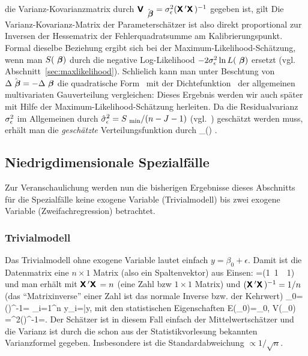 die Varianz-Kovarianzmatrix durch
$\textbf{\textsf{V}}\,_{\hat{{\mbox{ \boldmath{$\beta$}}}}}=\sigma_{\epsilon}^2(\textbf{\textsf{X}}\,'\textbf{\textsf{X}}\,)^{-1}$ gegeben ist, gilt
Die Varianz-Kovarianz-Matrix der Parametersch\"atzer ist also direkt
proportional zur Inversen der Hessematrix der Fehlerquadratsumme am Kalibrierungspunkt.
Formal dieselbe Beziehung ergibt sich bei der
Maximum-Likelihood-Sch\"atzung, wenn man $S({\mbox{ \boldmath{$\beta$}}})$
durch die negative Log-Likelihood $-2\sigma_{\epsilon}^2 \ln L({\mbox{ \boldmath{$\beta$}}})$ ersetzt
(vgl. Abschnitt~\ref{sec:maxlikelihood}).
Schlie\3lich kann man unter Beschtung von $\Delta \hat{{\mbox{ \boldmath{$\beta$}}}}=-\Delta
{\mbox{ \boldmath{$\beta$}}}$ die quadratische Form~ mit der
Dichtefunktion~ 
der allgemeinen
multivariaten Gau\3verteilung vergleichen:
Dieses Ergebnis werden wir auch sp\"ater mit Hilfe der
Maximum-Likelihood-Sch\"atzung herleiten.
Da die Residualvarianz $\sigma_{\epsilon}^2$ im Allgemeinen durch
$\hat{\sigma}_{\epsilon}^2=S_{{\mbox{ {\scriptsize \hspace{-0.0ex}min}}}}/(n-J-1)$ (vgl.~) gesch\"atzt
werden muss, erh\"alt man die \emph{gesch\"atzte} Verteilungsfunktion
durch
\be
\label{betaDensitySSEest}
_{\hatvecbeta}(\vecbeta) \propto \exp
{}.
\ee





\subsection{\label{sec:linStatSpez}Niedrigdimensionale Spezialf\"alle}

Zur Veranschaulichung werden nun die bisherigen Ergebnisse dieses
Abschnitts f\"ur die Spezialf\"alle keine exogene Variable
(Trivialmodell) bis zwei exogene Variable (Zweifachregression)
betrachtet.

\subsubsection{\label{sec:linStatTriv}Trivialmodell}

Das Trivialmodell ohne exogene Variable lautet einfach
$y=\beta_0+\epsilon$. Damit ist die Datenmatrix eine $n\times 1$ Matrix (also
ein Spaltenvektor) aus Einsen:
\bdm
{}\tr=(1\ 1\ \hdots \ 1)
\edm
und man erh\"alt mit $\textbf{\textsf{X}}\,'\textbf{\textsf{X}}\,=n$ (eine Zahl bzw $1\times 1$
Matrix) und $(\textbf{\textsf{X}}\,'\textbf{\textsf{X}}\,)^{-1}=1/n$ (das ``Matrixinverse'' einer
Zahl ist das normale Inverse bzw. der Kehrwert)
\be
\hatbeta_0=(\tr{})^{-1}\tr {}=
\sum_{i=1}^n y_i=\bar{y},
\ee
mit den statistischen Eigenschaften
\be
E(\hatbeta_0)=\beta_0, \quad
V(\hatbeta_0)
=\sigeps^2(\tr{})^{-1}=.
\ee
Der Sch\"atzer ist in diesem Fall einfach der Mittelwertsch\"atzer und
die  Varianz ist durch die schon aus der Statistikvorlesung bekannten
Varianzformel gegeben. Insbesondere ist die Standardabweichung $\propto
1/\sqrt{n}$.

